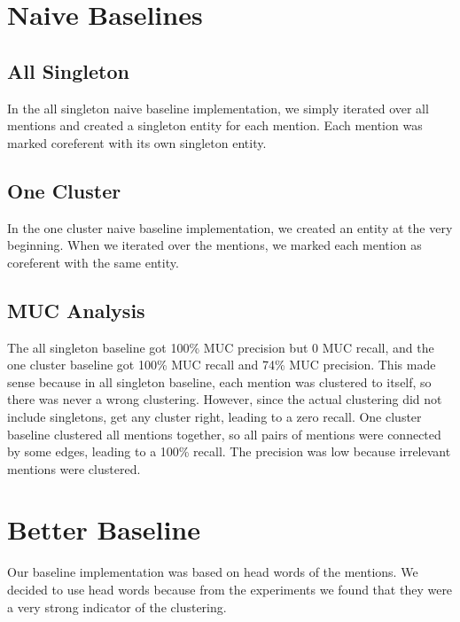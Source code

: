 \documentclass[12pt, twocolumn]{article}
\begin{document}

\section{Naive Baselines}
\subsection{All Singleton}
In the all singleton naive baseline implementation, we simply iterated over all mentions and created a singleton entity for each mention. Each mention was marked coreferent with its own singleton entity.

\subsection{One Cluster}
In the one cluster naive baseline implementation, we created an entity at the very beginning. When we iterated over the mentions, we marked each mention as coreferent with the same entity.

\subsection{MUC Analysis}
The all singleton baseline got 100\% MUC precision but 0 MUC recall, and the one cluster baseline got 100\% MUC recall and 74\% MUC precision. This made sense because in all singleton baseline, each mention was clustered to itself, so there was never a wrong clustering. However, since the actual clustering did not include singletons, get any cluster right, leading to a zero recall. One cluster baseline clustered all mentions together, so all pairs of mentions were connected by some edges, leading to a 100\% recall. The precision was low because irrelevant mentions were clustered.

\section{Better Baseline}
Our baseline implementation was based on head words of the mentions. We decided to use head words because from the experiments we found that they were a very strong indicator of the clustering.
\end{document}
